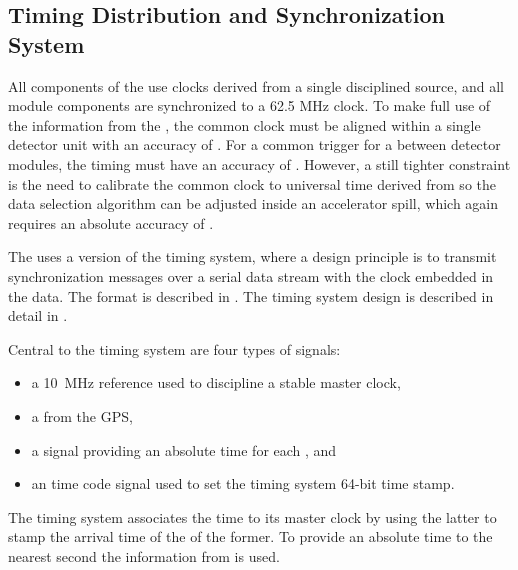 \subsection{Timing Distribution and Synchronization System}
\label{sec:sp-daq:design-timing}

All components of the  use clocks derived from a single  disciplined source, and all module components are synchronized to a 62.5 MHz clock. 
To make full use of the information from the , the common clock must be aligned within a single detector unit with an accuracy of . 
For a common trigger for a  between detector modules, the timing must have an accuracy of .
However, a still tighter constraint is the need to calibrate the common clock to universal time derived from  so the data selection algorithm can be adjusted inside an accelerator spill, which again requires an absolute accuracy of .

The   uses a version of the  timing
system, where a design principle is to transmit synchronization messages over
a serial data stream with the clock embedded in the data. The format
is described in . The timing system design is
described in detail in .

Central to the timing system are four types of signals:
\begin{itemize}
\item a \SI{10}{\mega\hertz} reference used to discipline a stable master clock,
\item a  from the GPS,
\item a  signal providing an absolute time for each , and
\item an  time code signal
  used to set the timing system 64-bit time stamp.
\end{itemize}
The timing system associates the  time to its master clock by using the latter to stamp the arrival time of the  of the former.
To provide an absolute time to the nearest second the information from  is used.

